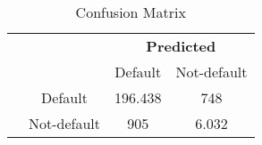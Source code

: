 \begin{table}[H]
     \centering
     \caption{Confusion Matrix}
     \label{tab:Confusion_matrix}
     \begin{tabular}{@{}cc cc@{}}
     \multicolumn{1}{c}{} &\multicolumn{1}{c}{} &\multicolumn{2}{c}{\textbf{Predicted}} \\
     \cmidrule(lr){3-4}
     \multicolumn{1}{c}{} & 
     \multicolumn{1}{c}{} & 
     \multicolumn{1}{c}{Default} & 
     \multicolumn{1}{c}{Not-default} \\
     \vspace{0.1cm}
     \cline{2-4}
     \multirow[c]{2}{*}{\rotatebox[origin=tr]{90}{\textbf{Actual}}} & Default  & 196.438&748 \\[1.5ex] & Not-default &905&6.032 \\ \cline{2-4}
     \end{tabular}
     \end{table}